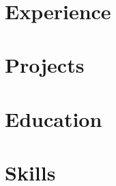 \documentclass[11pt]{article}
\begin{document}
\begin{center}
  \begin{minipage}{0.5\textwidth}
    {\Huge\bfseries \cvname}\vspace{1ex} \\
    {\large \cvjobtitle}
  \end{minipage} \hfill
  \begin{minipage}{0.42\textwidth}
    
  \end{minipage}
\end{center}

\section{Experience}


\section{Projects}


\section{Education}


\section{Skills}

\end{document}
